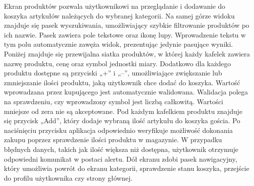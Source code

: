 Ekran produktów pozwala użytkownikowi na przeglądanie i dodawanie do koszyka artykułów należących do wybranej kategorii. Na samej górze widoku znajduje się pasek wyszukiwania, umożliwiający szybkie filtrowanie produktów po ich nazwie. Pasek zawiera pole tekstowe oraz ikonę lupy. Wprowadzenie tekstu w tym polu automatycznie zawęża widok, prezentując jedynie pasujące wyniki. Poniżej znajduje się przewijalna siatka produktów, w której każdy kafelek zawiera nazwę produktu, cenę oraz symbol jednostki miary. Dodatkowo dla każdego produktu dostępne są przyciski „+” i „–”, umożliwiające zwiększanie lub zmniejszanie ilości produktu, jaką użytkownik chce dodać do koszyka. Wartość wprowadzana przez kupującego jest automatycznie walidowana. Walidacja polega na sprawdzeniu, czy wprowadzony symbol jest liczbą całkowitą. Wartości mniejsze od zera nie są akceptowane. Pod każdym kafelkiem produktu znajduje się przycisk „Add”, który dodaje wybraną ilość artykułu do koszyka gościa. Po naciśnięciu przycisku aplikacja odpowiednio weryfikuje możliwość dokonania zakupu poprzez sprawdzenie ilości produktu w magazynie. W przypadku błędnych danych, takich jak ilość większa niż dostępna, użytkownik otrzymuje odpowiedni komunikat w postaci alertu. Dół ekranu zdobi pasek nawigacyjny, który umożliwia powrót do ekranu kategorii, sprawdzenie stanu koszyka, przejście do profilu użytkownika czy strony głównej.

